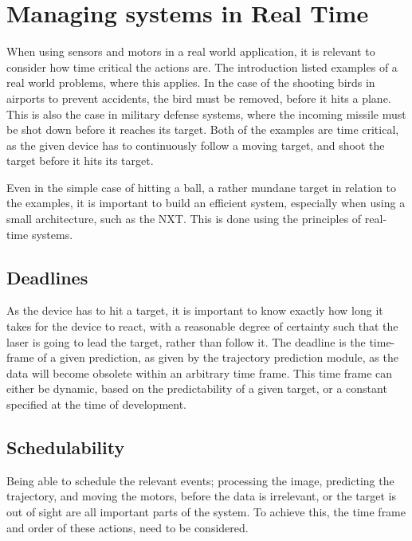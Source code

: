 
\section{Managing systems in Real Time}
\label{sec:rts-intro}
When using sensors and motors in a real world application, it is relevant to consider how time critical the actions are.
The introduction listed examples of a real world problems, where this applies.
In the case of the shooting birds in airports to prevent accidents, the bird must be removed, before it hits a plane.
This is also the case in military defense systems, where the incoming missile must be shot down before it reaches its target. 
Both of the examples are time critical, as the given device has to continuously follow a moving target, and shoot the target before it hits its target.

Even in the simple case of hitting a ball, a rather mundane target in relation to the examples, it is important to build an efficient system, especially when using a small architecture, such as the NXT.
This is done using the principles of real-time systems.

\subsection{Deadlines}
As the device has to hit a target, it is important to know exactly how long it takes for the device to react, with a reasonable degree of certainty such that the laser is going to lead the target, rather than follow it. 
The deadline is the time-frame of a given prediction, as given by the trajectory prediction module, as the data will become obsolete within an arbitrary time frame.
This time frame can either be dynamic, based on the predictability of a given target, or a constant specified at the time of development.

\subsection{Schedulability}
Being able to schedule the relevant events; processing the image, predicting the trajectory, and moving the motors, before the data is irrelevant, or the target is out of sight are all important parts of the system.
To achieve this, the time frame and order of these actions, need to be considered. 
\\\\
